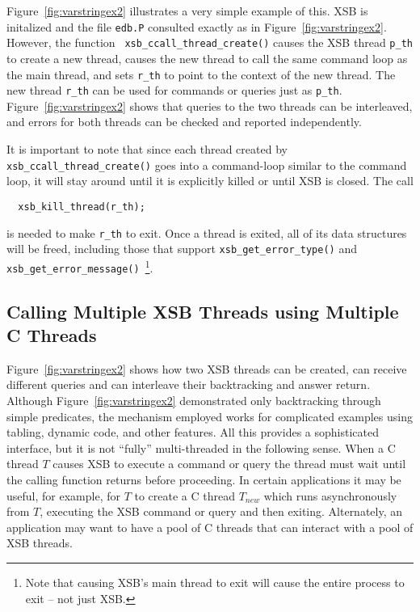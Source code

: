Figure~\ref{fig:varstringex2} illustrates a very simple example of
this.  XSB is initalized and the file {\tt edb.P} consulted exactly as
in Figure~\ref{fig:varstringex2}.  However, the function {\tt
  xsb\_ccall\_thread\_create()} causes the XSB thread {\tt p\_th} to
create a new thread, causes the new thread to call the same command
loop as the main thread, and sets {\tt r\_th} to point to the context
of the new thread.  The new thread {\tt r\_th} can be used for
commands or queries just as {\tt p\_th}.
Figure~\ref{fig:varstringex2} shows that queries to the two threads
can be interleaved, and errors for both threads can be checked and
reported independently.
 
It is important to note that since each thread created by {\tt
  xsb\_ccall\_thread\_create()} goes into a command-loop similar to
the command loop, it will stay around until it is explicitly killed or
until XSB is closed.  The call 
\begin{verbatim}
  xsb_kill_thread(r_th);
\end{verbatim}
is needed to make {\tt r\_th} to exit.  Once a thread is exited, all
of its data structures will be freed, including those that support
{\tt xsb\_get\_error\_type()} and {\tt
  xsb\_get\_error\_message()}~\footnote{Note that causing XSB's main
  thread to exit will cause the entire process to exit -- not just
  XSB.}.

\subsection{Calling Multiple XSB Threads using Multiple C Threads} \label{sec:CXSBMTMT}

Figure~\ref{fig:varstringex2} shows how two XSB threads can be
created, can receive different queries and can interleave their
backtracking and answer return.  Although
Figure~\ref{fig:varstringex2} demonstrated only backtracking through
simple predicates, the mechanism employed works for complicated
examples using tabling, dynamic code, and other features.  All this
provides a sophisticated interface, but it is not ``fully''
multi-threaded in the following sense.  When a C thread $T$ causes XSB
to execute a command or query the thread must wait until the calling
function returns before proceeding.  In certain applications it may be
useful, for example, for $T$ to create a C thread $T_{new}$ which runs
asynchronously from $T$, executing the XSB command or query and then
exiting.  Alternately, an application may want to have a pool of C
threads that can interact with a pool of XSB threads.

